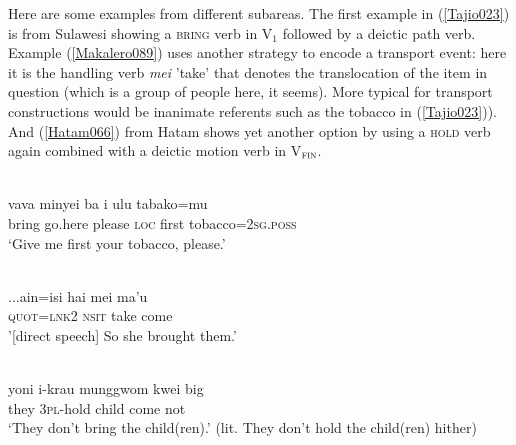 Here are some examples from different subareas. The first example in (\ref{Tajio023}) is from Sulawesi showing a \textsc{bring} verb in V$_{1}$ followed by a deictic path verb. Example (\ref{Makalero089}) uses another strategy to encode a transport event: here it is the handling verb \textit{mei} 'take' that denotes the translocation of the item in question (which is a group of people here, it seems). More typical for transport constructions would be inanimate referents such as the tobacco in (\ref{Tajio023})). And (\ref{Hatam066}) from Hatam shows yet another option by using a \textsc{hold} verb again combined with a deictic motion verb in V$_{\textsc{fin}}$.

\ea \label{Tajio023}
\\
\gll vava minyei ba i ulu tabako=mu \\
bring go.here please \textsc{loc} first tobacco=\textsc{2}\textsc{sg}.\textsc{poss} \\
\glft ‘Give me first your tobacco, please.'\\ 
\z

\ea \label{Makalero089}
\\
\gll ...ain=isi hai mei ma’u \\
\textsc{quot}=\textsc{lnk}\textsc{2} \textsc{nsit} take come \\
\glft '[direct speech] So she brought
them.'\\ 
\z

\ea \label{Hatam066}
\\
\gll yoni i-krau munggwom kwei big \\
they \textsc{3}\textsc{pl}-hold child come not \\
\glft `They don't bring the child(ren).' (lit. They don't hold the child(ren) hither) \\ 
\z

